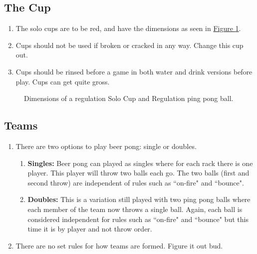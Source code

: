 	\subsection{The Cup}\label{ssec:Cup}
        \begin{enumerate}[label=(\roman*), ref=\roman*]
            \item \label{itm:Cup,dim} The solo cups are to be red,  and have the dimensions as seen in \hyperref[fig:solocup]{Figure \ref*{fig:solocup}}. 
            \item \label{itm:Cup,broken} Cups should not be used if broken or cracked in any way. Change this cup out. 
            \item \label{ssec:Cup,rinsing} Cups should be rinsed before a game in both water and drink versions before play. Cups can get quite gross. 
        \end{enumerate}
        \begin{figure}[H]
            \centering
            \def\svgwidth{\columnwidth}
            
            \caption{Dimensions of a regulation  Solo Cup and Regulation ping pong ball.}
            \label{fig:solocup}
        \end{figure}
	\subsection{Teams}\label{ssec:Teams}
		\begin{enumerate}[label=(\roman*), ref=\roman*]
            \item \label{itm:teams,options} There are two options to play beer pong: single or doubles. 
                \begin{enumerate}[label=(\alph*), leftmargin=2cm]%
                    \item \textbf{Singles:} Beer pong can played as singles where for each rack there is one player.
                        This player will throw two balls each go. 
                        The two balls (first and second throw) are independent of rules such as ``on-fire" and ``bounce".
                    \item \textbf{Doubles:}	This is a variation still played with two ping pong balls where each member of the team now throws a single ball.
                        Again, each ball is considered independent for rules such as ``on-fire" and ``bounce" but this time it is by player and not throw order.
                \end{enumerate} 
            \item \label{itm:teams,choosing} There are no set rules for how teams are formed. Figure it out bud. 
        \end{enumerate}

